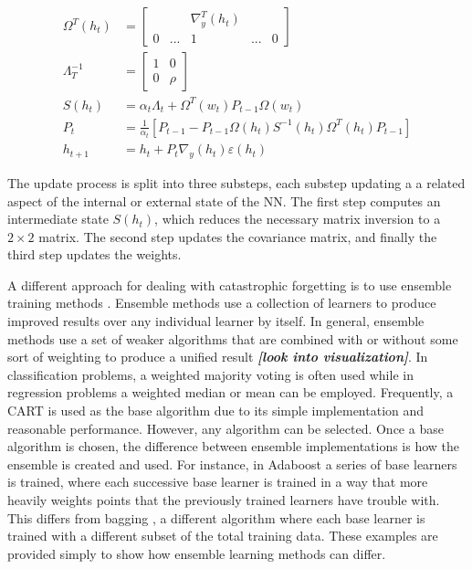 	\begin{align}\label{bg:RLM_ref}
		\Omega^T(h_t) &= \begin{bmatrix}
			&& \nabla_y^T(h_t) && \\ 0 & ... & 1 & ... & 0
		\end{bmatrix} \\
		\Lambda_{T}^{-1} &= \begin{bmatrix}
			1&0\\0&\rho
		\end{bmatrix} \\
		S(h_t) &= \alpha_t\Lambda_t + \Omega^T(w_t)P_{t-1}\Omega(w_t) \\
		P_t &= \frac{1}{\alpha_t}[P_{t-1}-P_{t-1}\Omega(h_t)S^{-1}(h_t)\Omega^T(h_t)P_{t-1}]\\
		h_{t+1} &= h_t + P_t \nabla_y(h_t)\varepsilon(h_t) 
	\end{align}
	\par The update process is split into three substeps, each substep updating a a related aspect of the internal or external state of the NN. The first step computes an intermediate state $S(h_t)$, which reduces the necessary matrix inversion to a $2\times2$ matrix. The second step updates the covariance matrix, and finally the third step updates the weights. 
	\par A different approach for dealing with catastrophic forgetting is to use ensemble training methods \cite{placeholderCitation}. Ensemble methods use a collection of learners to produce improved results over any individual learner by itself. In general, ensemble methods use a set of weaker algorithms that are combined with or without some sort of weighting to produce a unified result \textbf{\textit{[look into visualization]}}. In classification problems, a weighted majority voting is often used while in regression problems a weighted median or mean can be employed. Frequently, a CART is used as the base algorithm due to its simple implementation and reasonable performance. However, any algorithm can be selected. Once a base algorithm is chosen, the difference between ensemble implementations is how the ensemble is created and used. For instance, in Adaboost \cite{placeholderCitation} a series of base learners is trained, where each successive base learner is trained in a way that more heavily weights points that the previously trained learners have trouble with. This differs from bagging \cite{placeholderCitation}, a different algorithm where each base learner is trained with a different subset of the total training data. These examples are provided simply to show how ensemble learning methods can differ.
